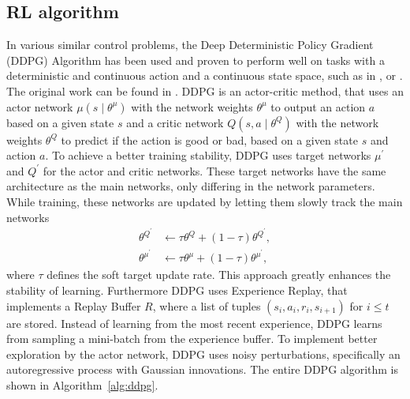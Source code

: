 \documentclass[review]{elsarticle}
\providecommand{\3}{{\ss}}
\begin{document}
	\subsection{\label{RL-algorithm}RL algorithm}
	In various similar control problems, the Deep Deterministic Policy
	Gradient (DDPG) Algorithm has been used and proven to perform well on
	tasks with a deterministic and continuous action and a
	continuous state space, such as in
	\cite{SafeEfficientAndComfortable}, \cite{ComparisonRLvsMPC} or
	\cite{HumanLikeAutonomouCF}. The original work can be found in
	\cite{DDPG}. DDPG is an actor-critic method, that uses an actor network
	$\mu\left(s \mid \theta^{\mu}\right)$ with the network weights $\theta^{\mu} $
	to output an action $a$ based on a given state $s$ and a critic network
	$Q\left(s, a \mid \theta^{Q}\right) $ with the network weights  $\theta^{Q}$ to
	predict if the action is good or bad, based on a given state $s$ and
	action $a$. 
	To achieve a better training stability, DDPG uses target networks  $\mu^{\prime}$ and $Q^{\prime}$ for the actor and critic networks.
	These target networks have the same architecture as the main networks, only differing in the network parameters. While training, these networks are updated by
	letting them slowly track the main networks
	\begin{align}
	\theta^{Q^{\prime}} & \leftarrow \tau \theta^{Q}+(1-\tau) \theta^{Q^{\prime}}, \\
	\theta^{\mu^{\prime}} & \leftarrow \tau \theta^{\mu}+(1-\tau) \theta^{\mu^{\prime}},
	\end{align}
	where $\tau$ defines the soft target update rate.
	This approach greatly enhances the stability of learning.
	Furthermore DDPG uses Experience Replay, that implements a Replay Buffer $R$, where a list of tuples $\left(s_{i}, a_{i}, r_{i}, s_{i+1}\right)$ for $i \le t$ are stored. Instead of learning from the most recent experience, DDPG learns from sampling a mini-batch from the experience buffer. To implement better exploration by the actor network, DDPG uses noisy perturbations, specifically an autoregressive process with Gaussian innovations. The entire DDPG algorithm is shown in Algorithm~\ref{alg:ddpg}. 
	
\end{document}
